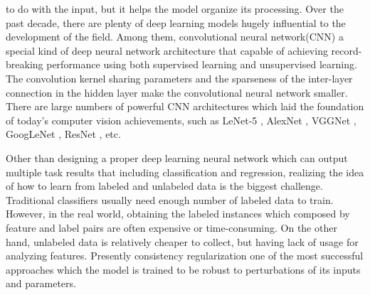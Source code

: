 to do with the input, but it helps the model organize its processing. Over the past decade, there are plenty of deep learning
models hugely influential to the development of the field. Among them, convolutional neural network(CNN) \cite{726791} \cite{NIPS2012_4824} a special 
kind of deep neural network architecture that capable of achieving record-breaking performance using both 
supervised learning and unsupervised learning. The convolution kernel sharing parameters and the sparseness of 
the inter-layer connection in the hidden layer make the convolutional neural network smaller. There are large numbers 
of powerful CNN architectures which laid the foundation of today's computer vision achievements, such as LeNet-5 \cite{DBLP:journals/corr/GuWKMSSLWW15}, 
AlexNet \cite{Krizhevsky:2017:ICD:3098997.3065386}, VGGNet \cite{vgg}, GoogLeNet \cite{DBLP:journals/corr/SzegedyLJSRAEVR14}, ResNet \cite{DBLP:journals/corr/HeZRS15}, etc.

Other than designing a proper deep learning neural network which can output multiple task results that including classification
and regression, realizing the idea of how to learn from labeled and unlabeled data is the biggest challenge. Traditional
classifiers usually need enough number of labeled data to train. However, in the real world, obtaining the labeled instances which 
composed by feature and label pairs are often expensive or time-consuming. On the other hand, unlabeled data is relatively
cheaper to collect, but having lack of usage for analyzing features. Presently consistency regularization \cite{DBLP:journals/corr/abs-1806-05594} \cite{DBLP:journals/corr/CilibertoRR16}
one of the most successful 
approaches which the model is trained to be robust to perturbations of its inputs and parameters. 

